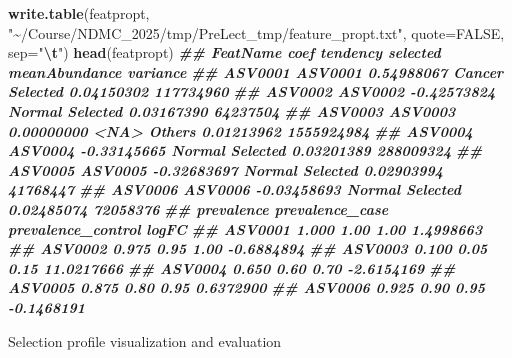 \documentclass[
]{article}
\newenvironment{Shaded}{\begin{snugshade}}{\end{snugshade}}
\newcommand{\AttributeTok}[1]{\textcolor[rgb]{0.13,0.29,0.53}{#1}}
\newcommand{\ConstantTok}[1]{\textcolor[rgb]{0.56,0.35,0.01}{#1}}
\newcommand{\DocumentationTok}[1]{\textcolor[rgb]{0.56,0.35,0.01}{\textbf{\textit{#1}}}}
\newcommand{\FunctionTok}[1]{\textcolor[rgb]{0.13,0.29,0.53}{\textbf{#1}}}
\newcommand{\NormalTok}[1]{#1}
\newcommand{\SpecialCharTok}[1]{\textcolor[rgb]{0.81,0.36,0.00}{\textbf{#1}}}
\newcommand{\StringTok}[1]{\textcolor[rgb]{0.31,0.60,0.02}{#1}}
\begin{document}
\begin{Shaded}
\begin{Highlighting}[]
\FunctionTok{write.table}\NormalTok{(featpropt, }\StringTok{"\textasciitilde{}/Course/NDMC\_2025/tmp/PreLect\_tmp/feature\_propt.txt"}\NormalTok{, }\AttributeTok{quote=}\ConstantTok{FALSE}\NormalTok{, }\AttributeTok{sep=}\StringTok{"}\SpecialCharTok{\textbackslash{}t}\StringTok{"}\NormalTok{)}
\FunctionTok{head}\NormalTok{(featpropt)}
\DocumentationTok{\#\#         FeatName        coef tendency selected meanAbundance   variance}
\DocumentationTok{\#\# ASV0001  ASV0001  0.54988067   Cancer Selected    0.04150302  117734960}
\DocumentationTok{\#\# ASV0002  ASV0002 {-}0.42573824   Normal Selected    0.03167390   64237504}
\DocumentationTok{\#\# ASV0003  ASV0003  0.00000000     \textless{}NA\textgreater{}   Others    0.01213962 1555924984}
\DocumentationTok{\#\# ASV0004  ASV0004 {-}0.33145665   Normal Selected    0.03201389  288009324}
\DocumentationTok{\#\# ASV0005  ASV0005 {-}0.32683697   Normal Selected    0.02903994   41768447}
\DocumentationTok{\#\# ASV0006  ASV0006 {-}0.03458693   Normal Selected    0.02485074   72058376}
\DocumentationTok{\#\#         prevalence prevalence\_case prevalence\_control      logFC}
\DocumentationTok{\#\# ASV0001      1.000            1.00               1.00  1.4998663}
\DocumentationTok{\#\# ASV0002      0.975            0.95               1.00 {-}0.6884894}
\DocumentationTok{\#\# ASV0003      0.100            0.05               0.15 11.0217666}
\DocumentationTok{\#\# ASV0004      0.650            0.60               0.70 {-}2.6154169}
\DocumentationTok{\#\# ASV0005      0.875            0.80               0.95  0.6372900}
\DocumentationTok{\#\# ASV0006      0.925            0.90               0.95 {-}0.1468191}
\end{Highlighting}
\end{Shaded}

Selection profile visualization and evaluation
\end{document}
